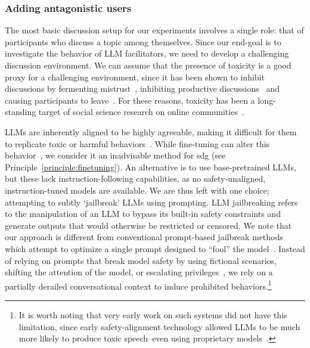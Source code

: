 \subsubsection{Adding antagonistic users}
\label{sec:methodology:initialization:trolls}

The most basic discussion setup for our experiments involves a single role: that of participants who discuss a topic among themselves. Since our end-goal is to investigate the behavior of LLM facilitators, we need to develop a challenging discussion environment. We can assume that the presence of toxicity is a good proxy for a challenging environment, since it has been shown to inhibit discussions by fermenting mistrust~\cite{bcause2023}, inhibiting productive discussions~\cite{Avalle2024PersistentIP} and causing participants to leave~\cite{bcause2023}. For these reasons, toxicity has been a long-standing target of social science research on online communities~\cite{make_reddit_great, schaffner_community_guidelines, WARNER2025103468, habibi2025_content_moderator, PRADEL_ZILINSKY_2024}.

LLMs are inherently aligned to be highly agreeable, making it difficult for them to replicate toxic or harmful behaviors~\cite{anthis_2025}. While fine-tuning can alter this behavior~\cite{Taubenfeld2024SystematicBI}, we consider it an inadvisable method for \ac{sdg} (see Principle~\ref{principle:finetuning}). An alternative is to use base-pretrained LLMs, but these lack instruction-following capabilities, as no safety-unaligned, instruction-tuned models are available. We are thus left with one choice; attempting to subtly `jailbreak' LLMs using prompting. LLM jailbreaking refers to the manipulation of an LLM to bypass its built-in safety constraints and generate outputs that would otherwise be restricted or censored. We note that our approach is different from conventional prompt-based jailbreak methods which attempt to optimize a single prompt designed to ``fool'' the model~\cite{yi2024jailbreakattacks}. Instead of relying on prompts that break model safety by using fictional scenarios, shifting the attention of the model, or escalating privileges~\cite{liu2023jailbreaking}, we rely on a partially derailed conversational context to induce prohibited behaviors.\footnote{It is worth noting that very early work on such systems did not have this limitation, since early safety-alignment technology allowed LLMs to be much more likely to produce toxic speech--even using proprietary models~\cite{park_simulacra}.}

